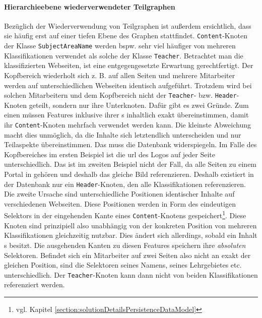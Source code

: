     \paragraph*{Hierarchieebene wiederverwendeter Teilgraphen}
    Bezüglich der Wiederverwendung von Teilgraphen ist außerdem ersichtlich,
    dass sie häufig erst auf einer tiefen Ebene des Graphen stattfindet.
    \texttt{Content}-Knoten der Klasse \texttt{SubjectAreaName} werden bspw.
    sehr viel häufiger von mehreren Klassifikationen verwendet als solche der
    Klasse \texttt{Teacher}.
    Betrachtet man die klassifizierten Webseiten,
    ist eine entgegengesetzte Erwartung gerechtfertigt.
    Der Kopfbereich wiederholt sich z. B. auf allen Seiten
    und mehrere Mitarbeiter werden auf unterschiedlichen Webseiten identisch aufgeführt.
    Trotzdem wird bei solchen Mitarbeitern und dem Kopfbereich
    nicht der \texttt{Teacher}- bzw. \texttt{Header}-Knoten geteilt,
    sondern nur ihre Unterknoten.
    Dafür gibt es zwei Gründe.
    Zum einen müssen Features inklusive ihrer {\childFeature}s inhaltlich
    exakt übereinstimmen, damit ihr \texttt{Content}-Knoten mehrfach verwendet werden kann.
    Die kleinste Abweichung macht dies unmöglich,
    da die Inhalte sich letztendlich unterscheiden und nur Teilaspekte übereinstimmen.
    Das muss die Datenbank widerspiegeln.
    Im Falle des Kopfbereiches im ersten Beispiel ist die \gls{url} des Logos
    auf jeder Seite unterschiedlich.
    Das ist im zweiten Beispiel nicht der Fall,
    da alle Seiten zu einem Portal in {\wordpress} gehören
    und deshalb das gleiche Bild referenzieren.
    Deshalb existiert in der Datenbank nur ein \texttt{Header}-Knoten,
    den alle Klassifikationen referenzieren.
    Die zweite Ursache sind unterschiedliche Positionen identischer Inhalte
    auf verschiedenen Webseiten.
    Diese Positionen werden in Form des eindeutigen Selektors in der eingehenden
    Kante eines \texttt{Content}-Knotens gespeichert\footnote{vgl. Kapitel \ref{section:solutionDetailsPersistenceDataModel}}.
    Diese Knoten sind prinzipiell also unabhängig von der konkreten Position
    von mehreren Klassifikationen gleichzeitig nutzbar.
    Dies ändert sich allerdings, sobald ein Inhalt {\childFeature}s besitzt.
    Die ausgehenden Kanten zu diesen Features speichern ihre \textit{absoluten} Selektoren.
    Befindet sich ein Mitarbeiter auf zwei Seiten also nicht an exakt der gleichen Position,
    sind die Selektoren seines Namens, seines Lehrgebietes etc. unterschiedlich.
    Der \texttt{Teacher}-Knoten kann dann nicht von beiden Klassifikationen referenziert
    werden.
    
